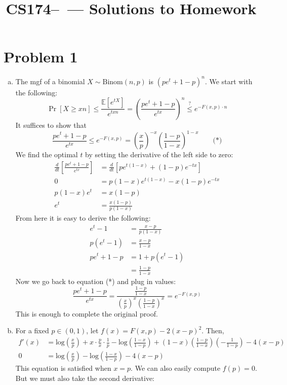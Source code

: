 \documentclass[11pt]{article}
\title{CS174--\Session\  --- Solutions to Homework \Homework}
\author{\Name}
\newcommand{\E}{\mathbb{E}}
\newcommand{\p}[1]{\left(#1\right)}
\renewcommand{\log}[1]{\text{log}\p{#1}}
\begin{document}
\maketitle
{}
\setcounter{problemnumber}{0}

\section*{Problem 1}
\begin{enumerate}[(a)]
\item The mgf of a binomial $X\sim\text{Binom}(n,p)$ is $(pe^t+1-p)^n$. We start with the following: $$\Pr[X\geq xn] \leq \frac{\E[e^{tX}]}{e^{txn}} = \left(\frac{pe^t+1-p}{e^{tx}}\right)^n \stackrel{?}{\leq} e^{-F(x,p)\cdot n}$$
It suffices to show that $$\frac{pe^t+1-p}{e^{tx}} \leq e^{-F(x,p)}=\left(\frac xp\right)^{-x}\left(\frac{1-p}{1-x}\right)^{1-x} \qquad\text{(*)}$$
We find the optimal $t$ by setting the derivative of the left side to zero: \begin{align*}
\frac d{dt}\left[\frac{pe^t+1-p}{e^{tx}}\right] &= \frac d{dt}\left[pe^{t(1-x)}+(1-p)e^{-tx}\right]\\
0 &= p(1-x)e^{t(1-x)}-x(1-p)e^{-tx}\\
p(1-x)e^t &= x(1-p)\\
e^t &= \frac{x(1-p)}{p(1-x)}
\end{align*}
From here it is easy to derive the following: \begin{align*}
e^t-1 &= \frac{x-p}{p(1-x)}\\
p(e^t-1) &= \frac{x-p}{1-x}\\
pe^t+1-p &= 1+p(e^t-1)\\
&= \frac{1-p}{1-x}
\end{align*}
Now we go back to equation (*) and plug in values: $$\frac{pe^t+1-p}{e^{tx}} = \frac{\frac{1-p}{1-x}}{\left(\frac xp\right)^x\left(\frac{1-p}{1-x}\right)^x} = e^{-F(x,p)}$$
This is enough to complete the original proof.
\item For a fixed $p\in(0,1)$, let $f(x)=F(x,p)-2(x-p)^2$. Then, \begin{align*}
f'(x) &= \log{\frac xp}+x\cdot\frac px\cdot \frac1p - \log{\frac{1-x}{1-p}} + (1-x)\left(\frac{1-p}{1-x}\right)\left(-\frac1{1-p}\right) - 4(x-p)\\
0 &= \log{\frac xp}-\log{\frac{1-x}{1-p}}-4(x-p)
\end{align*}
This equation is satisfied when $x=p$. We can also easily compute $f(p)=0$. But we must also take the second derivative: \begin{align*}

\end{align*}
\end{enumerate}
\end{document}
